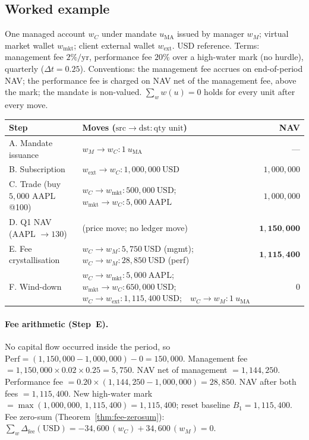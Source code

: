 \subsection{Worked example}
\label{sec:managed-example}

One managed account $w_C$ under mandate $u_{\mathrm{MA}}$ issued by manager $w_M$; virtual
market wallet $w_{\text{mkt}}$; client external wallet $w_{\text{ext}}$. USD reference.
Terms: management fee $2\%/\text{yr}$, performance fee $20\%$ over a high-water mark (no
hurdle), quarterly ($\Delta t=0.25$). Conventions: the management fee accrues on
end-of-period NAV; the performance fee is charged on NAV net of the management fee, above
the mark; the mandate is non-valued. $\sum_w w(u)=0$ holds for every unit after every move.

\begin{longtable}{p{4.3cm}p{7.2cm}r}
\toprule
\textbf{Step} & \textbf{Moves} ($\text{src}\to\text{dst}:\text{qty unit}$) & \textbf{NAV} \\
\midrule
A. Mandate issuance & $w_M\to w_C:1\ u_{\mathrm{MA}}$ & --- \\
B. Subscription & $w_{\text{ext}}\to w_C:1{,}000{,}000\ \text{USD}$ & $1{,}000{,}000$ \\
C. Trade (buy $5{,}000$ AAPL @100) & $w_C\to w_{\text{mkt}}:500{,}000\ \text{USD}$;\ \ $w_{\text{mkt}}\to w_C:5{,}000\ \text{AAPL}$ & $1{,}000{,}000$ \\
D. Q1 NAV (AAPL $\to 130$) & (price move; no ledger move) & $\mathbf{1{,}150{,}000}$ \\
E. Fee crystallisation & $w_C\to w_M:5{,}750\ \text{USD}$ (mgmt);\ \ $w_C\to w_M:28{,}850\ \text{USD}$ (perf) & $\mathbf{1{,}115{,}400}$ \\
F. Wind-down & $w_C\to w_{\text{mkt}}:5{,}000\ \text{AAPL}$;\ \ $w_{\text{mkt}}\to w_C:650{,}000\ \text{USD}$;\ \ $w_C\to w_{\text{ext}}:1{,}115{,}400\ \text{USD}$;\ \ $w_C\to w_M:1\ u_{\mathrm{MA}}$ & $0$ \\
\bottomrule
\end{longtable}

\paragraph{Fee arithmetic (Step~E).} No capital flow occurred inside the period, so
$\mathrm{Perf}=(1{,}150{,}000-1{,}000{,}000)-0=150{,}000$. Management fee
$=1{,}150{,}000\times0.02\times0.25=5{,}750$. NAV net of management $=1{,}144{,}250$. Performance
fee $=0.20\times(1{,}144{,}250-1{,}000{,}000)=28{,}850$. NAV after both fees $=1{,}115{,}400$. New
high-water mark $=\max(1{,}000{,}000,\,1{,}115{,}400)=1{,}115{,}400$; reset baseline
$B_1=1{,}115{,}400$. Fee zero-sum (Theorem~\ref{thm:fee-zerosum}):
$\sum_w\Delta_{\text{fee}}(\text{USD})=-34{,}600\,(w_C)+34{,}600\,(w_M)=0$.

